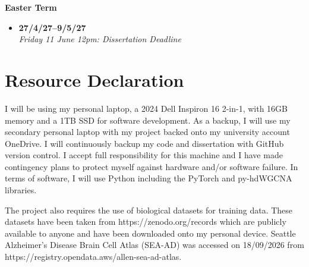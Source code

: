 \documentclass[12pt,a4paper]{report}
\begin{document}
\textbf{Easter Term}
\begin{itemize}
    \item \textbf{27/4/27--9/5/27} \\
    \textit{Friday 11 June 12pm: Dissertation Deadline} 
\end{itemize}
\section{Resource Declaration}

I will be using my personal laptop, a 2024 Dell Inspiron 16 2-in-1, with 16GB memory and a 1TB SSD for software development. As a backup, I will use my secondary personal laptop with my project backed onto my university account OneDrive. I will continuously backup my code and dissertation with GitHub version control. I accept full responsibility for this machine and I have made contingency plans to protect myself against hardware and/or software failure. In terms of software, I will use Python including the PyTorch and py-hdWGCNA libraries. 

The project also requires the use of biological datasets for training data. These datasets have been taken from https://zenodo.org/records which are publicly available to anyone and have been downloaded onto my personal device. Seattle Alzheimer's Disease Brain Cell Atlas (SEA-AD) was accessed on 18/09/2026 from https://registry.opendata.aws/allen-sea-ad-atlas.

\printbibliography
\end{document}
